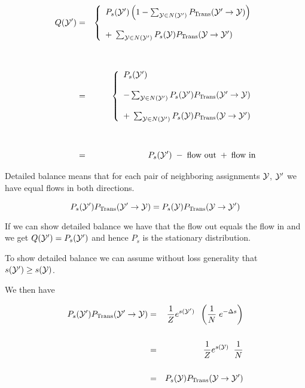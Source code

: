 {

{\huge
\begin{eqnarray*}
Q({\cal Y}')& = &  \left\{\begin{array}{l}P_s({\cal Y}')\left(1-\sum_{{\cal Y} \in N({\cal Y'})} P_\mathrm{Trans}({\cal Y}'\rightarrow {\cal Y})\right) \\
\\
  + \; \sum_{{\cal Y} \in N({\cal Y}')} P_s({\cal Y}){P_{\mathrm{Trans}}({\cal Y} \rightarrow {\cal Y}')}\end{array}\right. \\
  \\
  \\
  & = &  \left\{\begin{array}{l}P_s({\cal Y}') \\
  \\
  -\sum_{{\cal Y} \in N({\cal Y'})} P_s({\cal Y}')P_\mathrm{Trans}({\cal Y}'\rightarrow {\cal Y}) \\
\\
  + \; \sum_{{\cal Y} \in N({\cal Y}')} P_s({\cal Y}){P_{\mathrm{Trans}}({\cal Y} \rightarrow {\cal Y}')}\end{array}\right. \\
  \\
  \\
  &= & P_s({\cal Y}')\; - \;\mbox{flow out}\; +\;\mbox{flow in}
\end{eqnarray*}
}


Detailed balance means that for each pair of neighboring assignments ${\cal Y}$, ${\cal Y}'$ we have equal flows in both directions.

\vfill
$$P_s({\cal Y}')P_{\mathrm{Trans}}({\cal Y}' \rightarrow {\cal Y}) = P_s({\cal Y})P_{\mathrm{Trans}}({\cal Y} \rightarrow {\cal Y}')$$

\vfill
If we can show detailed balance we have that the flow out equals the flow in and we get $Q({\cal Y'}) = P_s({\cal Y}')$ and hence $P_s$ is the stationary distribution.


To show detailed balance we can assume without loss generality that $s({\cal Y}') \geq s({\cal Y})$.

\vfill
We then have

\begin{eqnarray*}
P_s({\cal Y}')P_{\mathrm{Trans}}({\cal Y}' \rightarrow {\cal Y}) & = & \frac{1}{Z}e^{s({\cal Y}')}\;\;\left(\frac{1}{N}\;e^{-\Delta s}\right) \\
\\
& = & \frac{1}{Z}e^{s({\cal Y})}\;\;\frac{1}{N} \\
\\
 &= &P_s({\cal Y})P_{\mathrm{Trans}}({\cal Y} \rightarrow {\cal Y}')
\end{eqnarray*}

}
